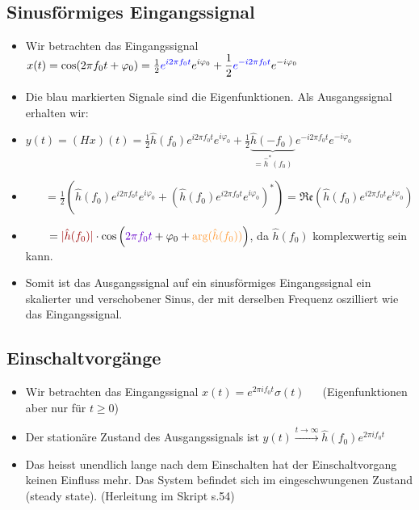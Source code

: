 \documentclass[11pt]{article}
\begin{document}
{\subsection*{Sinusförmiges Eingangssignal}
\vspace*{-0.5cm}
\begin{itemize}[leftmargin=0pt]
    \item[] Wir betrachten das Eingangssignal $x(t) = \cos(2 \pi f_0 t + \varphi_0) = \frac{1}{2} \displaystyle \textcolor{myblue}{e^{i 2 \pi f_0 t}} e^{i \varphi_0} + \frac{1}{2} \displaystyle \textcolor{myblue}{e^{-i 2 \pi f_0 t}} e^{-i \varphi_0}$
    \item[] Die \textcolor{myblue}{blau markierten Signale} sind die Eigenfunktionen. Als Ausgangssignal erhalten wir:
    \item[] $y(t) = (Hx)(t) = \frac{1}{2}\hat{h}(f_0)\displaystyle e^{i 2 \pi f_0 t} e^{i \varphi_0} + \frac{1}{2}\underbrace{\hat{h}(-f_0)}_{=\hat{h}^\ast (f_0)}e^{-i 2 \pi f_0 t} e^{-i \varphi_0}$
    \item[] $\hspace{20pt} = \frac{1}{2}\left(\hat{h}(f_0)e^{i 2 \pi f_0 t} e^{i \varphi_0} + \left(\hat{h}(f_0)e^{i 2 \pi f_0 t} \displaystyle e^{i \varphi_0}\right)^{\ast}\right) = \mathfrak{Re}\left(  \hat{h}(f_0) e^{i 2 \pi f_0 t} e^{i \varphi_0} \right)$
    \item[] $\hspace{20pt} = \textcolor{myred}{|\hat{h}(f_0)|}\cdot \cos\left(\textcolor{mypurple}{2 \pi f_0 t} + \varphi_0 + \textcolor{myorange}{\text{arg}(\hat{h}(f_0))}\right)$, da $\hat{h}(f_0)$ komplexwertig sein kann.
    \item[] Somit ist das Ausgangssignal auf ein sinusförmiges Eingangssignal ein \textcolor{myred}{skalierter} und \textcolor{myorange}{verschobener} Sinus, der mit \textcolor{mypurple}{derselben Frequenz} oszilliert wie das Eingangssignal.
\end{itemize}

\vspace*{-0.5cm}
\subsection*{Einschaltvorgänge}
\vspace*{-0.5cm}
\begin{itemize}[leftmargin=0pt]
    \item[] Wir betrachten das Eingangssignal $x(t) = \displaystyle e^{2 \pi i f_0 t} \sigma(t) \hspace{15pt}$ (Eigenfunktionen aber nur für $t\geq 0$)
    \item[] Der stationäre Zustand des Ausgangssignals ist $y(t) \displaystyle\xrightarrow{t \to \infty} \hat{h}(f_0) e^{2 \pi i f_0 t}$
    \item[] Das heisst unendlich lange nach dem Einschalten hat der Einschaltvorgang keinen Einfluss mehr. Das System befindet sich im eingeschwungenen Zustand (steady state). (Herleitung im Skript s.54)
\end{itemize}

}
\end{document}
